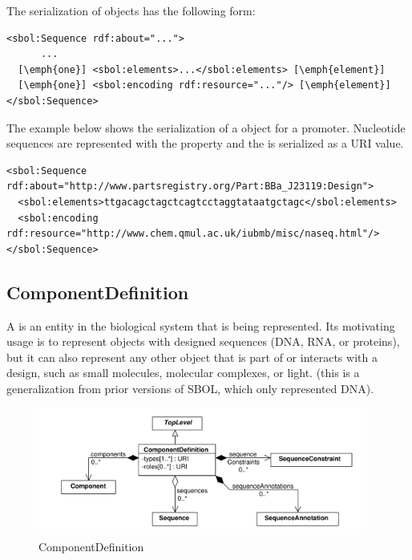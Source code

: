 The serialization of  objects has the following form:
\begin{lstlisting}
<sbol:Sequence rdf:about="...">
      ...
  [\emph{one}] <sbol:elements>...</sbol:elements> [\emph{element}]
  [\emph{one}] <sbol:encoding rdf:resource="..."/> [\emph{element}]
</sbol:Sequence>
\end{lstlisting}

The example below shows the serialization of a  object for a promoter. Nucleotide sequences are represented with the  property and the  is serialized as a URI value. 

\begin{lstlisting}
<sbol:Sequence rdf:about="http://www.partsregistry.org/Part:BBa_J23119:Design">
  <sbol:elements>ttgacagctagctcagtcctaggtataatgctagc</sbol:elements>
  <sbol:encoding rdf:resource="http://www.chem.qmul.ac.uk/iubmb/misc/naseq.html"/>
</sbol:Sequence>
\end{lstlisting}


\subsection{ComponentDefinition}
\label{sec:ComponentDefinition}

A  is an entity in the biological system that is being represented. Its motivating usage is to represent objects with designed sequences (DNA, RNA, or proteins), but it can also represent any other object that is part of or interacts with a design, such as small molecules, molecular complexes, or light.
(this is a generalization from prior versions of SBOL, which only represented DNA).

\begin{figure}[ht]
\begin{center}
\includegraphics[width=0.95\textwidth]{uml/component_definition}
\caption[]{ComponentDefinition}
\label{uml:component_definition}
\end{center}
\end{figure}



